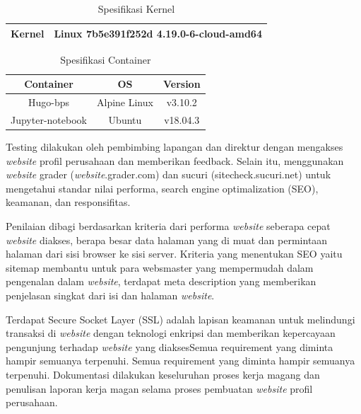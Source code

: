 \begin{table}[!htb]
    \caption{Spesifikasi Kernel}
    \begin{center}
    \begin{tabular}{|l|l|}
    \hline
    Kernel & Linux 7b5e391f252d 4.19.0-6-cloud-amd64\\
    \hline
    \end{tabular}
    \end{center}
 \end{table}

\begin{table}[htbp]
    \caption{Spesifikasi Container}
    \begin{center}
    \begin{tabular}{|c|c|c|}
        \hline
        Container & OS & Version\\
        \hline
        Hugo-bps & Alpine Linux & v3.10.2\\
        \hline
        Jupyter-notebook & Ubuntu & v18.04.3\\
        \hline
    \end{tabular}
    \end{center}
    \end{table}


Testing dilakukan oleh pembimbing lapangan dan direktur dengan mengakses \emph{website} profil perusahaan 
dan memberikan feedback. Selain itu, menggunakan \emph{website} grader (\emph{website}.grader.com) dan 
sucuri (sitecheck.sucuri.net) untuk mengetahui standar nilai performa, search engine optimalization (SEO), 
keamanan, dan responsifitas.

Penilaian dibagi berdasarkan kriteria dari performa \emph{website} seberapa cepat \emph{website} diakses, 
berapa besar data halaman yang di muat dan permintaan halaman dari sisi browser ke sisi server.  
Kriteria yang menentukan SEO yaitu sitemap membantu untuk para websmaster 
yang mempermudah dalam pengenalan dalam \emph{website}, terdapat meta description yang memberikan 
penjelasan singkat dari isi dan halaman \emph{website}. 

Terdapat Secure Socket Layer (SSL) adalah lapisan 
keamanan untuk melindungi transaksi di \emph{website} dengan teknologi enkripsi dan memberikan kepercayaan 
pengunjung terhadap \emph{website} yang diaksesSemua requirement yang diminta hampir semuanya terpenuhi. 
Semua requirement yang diminta hampir semuanya terpenuhi. 
Dokumentasi dilakukan keseluruhan proses kerja magang dan penulisan 
laporan kerja magan selama proses pembuatan \emph{website} profil perusahaan.

